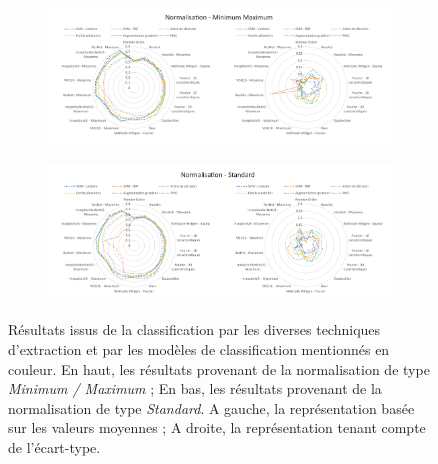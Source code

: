 \begin{figure}[H]
    \centering
    
    \begin{subfigure}{\textwidth}
      \includegraphics[width=\textwidth]{contents/chapter_4/resources/results_image_classification_mms.pdf}
    \end{subfigure}
    
    \begin{subfigure}{\textwidth}
      \includegraphics[width=\textwidth]{contents/chapter_4/resources/results_image_classification_ss.pdf}
    \end{subfigure}
    
    \caption{Résultats issus de la classification par les diverses techniques d'extraction et par les modèles de classification mentionnés en couleur. En haut, les résultats provenant de la normalisation de type \textit{Minimum / Maximum} ; En bas, les résultats provenant de la normalisation de type \textit{Standard}. A gauche, la représentation basée sur les valeurs moyennes ; A droite, la représentation tenant compte de l'écart-type.}
    \label{fig:results_image_classification}
\end{figure}\par

